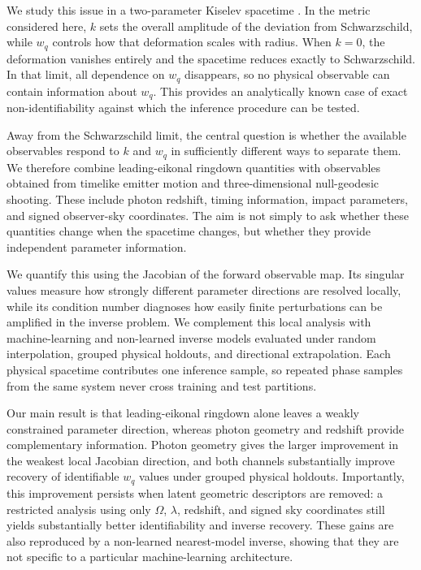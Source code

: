 \documentclass[11pt]{article}
\newcommand{\wq}{w_q}
\begin{document}
We study this issue in a two-parameter Kiselev spacetime
\cite{kiselev2003quintessence}. In the metric considered here, $k$ sets the
overall amplitude of the deviation from Schwarzschild, while $\wq$ controls
how that deformation scales with radius. When $k=0$, the deformation vanishes
entirely and the spacetime reduces exactly to Schwarzschild. In that limit, all
dependence on $\wq$ disappears, so no physical observable can contain
information about $\wq$. This provides an analytically known case of exact
non-identifiability against which the inference procedure can be tested.

Away from the Schwarzschild limit, the central question is whether the
available observables respond to $k$ and $\wq$ in sufficiently different ways
to separate them. We therefore combine leading-eikonal ringdown quantities
with observables obtained from timelike emitter motion and three-dimensional
null-geodesic shooting. These include photon redshift, timing information,
impact parameters, and signed observer-sky coordinates. The aim is not simply
to ask whether these quantities change when the spacetime changes, but whether
they provide independent parameter information.

We quantify this using the Jacobian of the forward observable map. Its singular
values measure how strongly different parameter directions are resolved
locally, while its condition number diagnoses how easily finite perturbations
can be amplified in the inverse problem. We complement this local analysis
with machine-learning and non-learned inverse models evaluated under random
interpolation, grouped physical holdouts, and directional extrapolation. Each
physical spacetime contributes one inference sample, so repeated phase samples
from the same system never cross training and test partitions.

Our main result is that leading-eikonal ringdown alone leaves a weakly
constrained parameter direction, whereas photon geometry and redshift provide
complementary information. Photon geometry gives the larger improvement in the
weakest local Jacobian direction, and both channels substantially improve
recovery of identifiable $\wq$ values under grouped physical holdouts.
Importantly, this improvement persists when latent geometric descriptors are
removed: a restricted analysis using only $\Omega$, $\lambda$, redshift, and
signed sky coordinates still yields substantially better identifiability and
inverse recovery. These gains are also reproduced by a non-learned
nearest-model inverse, showing that they are not specific to a particular
machine-learning architecture.
\end{document}
